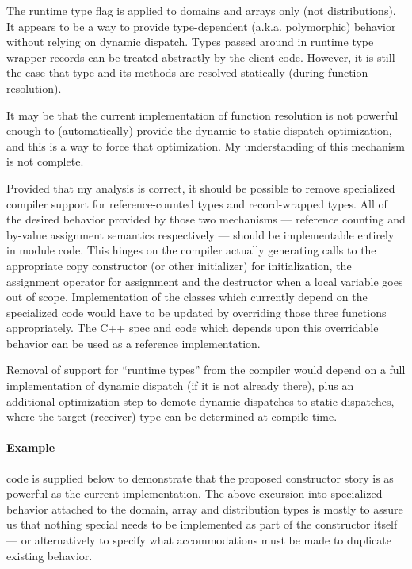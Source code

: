 The runtime type flag is applied to domains and arrays only (not
distributions).  It appears to be a way to provide type-dependent
(a.k.a. polymorphic) behavior without relying on dynamic dispatch.  Types passed
around in runtime type wrapper records can be treated abstractly by the client
code.  However, it is still the case that type and its methods are 
resolved statically (during function resolution).  

It may be that the current
implementation of function resolution is not powerful enough to (automatically)
provide the dynamic-to-static dispatch optimization, and this is a way to force
that optimization.  My understanding of this mechanism is not complete.

\vskip 0.3in

Provided that my analysis is correct, it should be possible to remove specialized
compiler support for reference-counted types and record-wrapped types.  All of
the desired behavior provided by those two mechanisms --- reference
counting and by-value assignment semantics respectively --- should be
implementable entirely in module code.  This hinges on the compiler actually
generating calls to the appropriate copy constructor (or other initializer) for
initialization, the assignment operator for assignment and the destructor when a
local variable goes out of scope.  Implementation of the classes which currently
depend on the specialized code would have to be updated by overriding those three
functions appropriately.  The C++ spec and code which depends upon this
overridable behavior can be used as a reference implementation.

Removal of support for ``runtime types'' from the compiler would depend on a
full implementation of dynamic dispatch (if it is not already there), plus an
additional optimization step to demote dynamic dispatches to static dispatches,
where the target (receiver) type can be determined at compile time.

\paragraph{Example}
code is supplied below to demonstrate that the proposed constructor story is as
powerful as the current implementation.  The above excursion into specialized
behavior attached to the domain, array and distribution types is mostly to
assure us that nothing special needs to be implemented as part of the constructor
itself --- or alternatively to specify what accommodations must be made to
duplicate existing behavior.  

